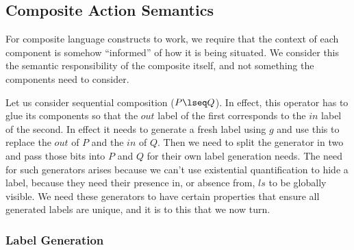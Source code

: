 \subsection{Composite Action Semantics}

For composite language constructs to work,
we require that the context of each component is somehow ``informed''
of how it is being situated.
We consider this the semantic responsibility of the composite itself,
and not something the components need to consider.

Let us consider sequential composition ($P \lseq Q$).
In effect, this operator has to glue its components
so that the $out$ label of the first corresponds to the $in$ label
of the second.
In effect it needs to generate a fresh label using $g$
and use this to replace the $out$ of $P$  and the $in$ of $Q$.
Then we need to split the generator in two and pass those bits
into $P$ and $Q$ for their own label generation needs.
The need for such generators arises because we can't use existential
quantification to hide a label,
because they need their presence in, or absence from, $ls$
to be globally visible.
We need these generators to have certain properties that ensure all
generated labels are unique,
and it is to this that we now turn.

\subsubsection{Label Generation}

